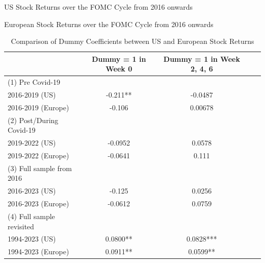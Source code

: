 
\begin{table}[h]
\begin{center}
\begin{adjustbox}{width=1\textwidth}

\end{tabular}
}
\end{adjustbox}
\caption{\label{table_3} US Stock Returns over the FOMC Cycle from 2016 onwards}
\end{center}
\end{table}


\begin{table}[h]
\begin{center}
\begin{adjustbox}{width=1\textwidth}

\end{tabular}
}
\end{adjustbox}
\caption{\label{table_4} European Stock Returns over the FOMC Cycle from 2016 onwards}
\end{center}
\end{table}

\begin{table}[h]
    \centering
    \caption{Comparison of Dummy Coefficients between US and European Stock Returns}
    \label{table:table_5}
    \begin{tabular}{l|cccc}
        \toprule
        & Dummy = 1 in Week 0 & Dummy = 1 in Week 2, 4, 6 \\
        \midrule
         (1) Pre Covid-19 &&\\
         2016-2019 (US) & -0.211** & -0.0487 \\
         2016-2019 (Europe) & -0.106 & 0.00678  \\
         \addlinespace
        (2) Post/During Covid-19&&\\
        2019-2022 (US) & -0.0952 & 0.0578 \\
        2019-2022 (Europe) & -0.0641 & 0.111 \\
            \addlinespace
        (3) Full sample from 2016&&\\
        2016-2023 (US) & -0.125 & 0.0256 \\
        2016-2023 (Europe) & -0.0612 & 0.0759 \\
          \addlinespace
        (4) Full sample revisited&&\\
        1994-2023 (US) & 0.0800** & 0.0828***  \\
        1994-2023 (Europe) & 0.0911**& 0.0599** \\
        \bottomrule
    \end{tabular}
\end{table}

